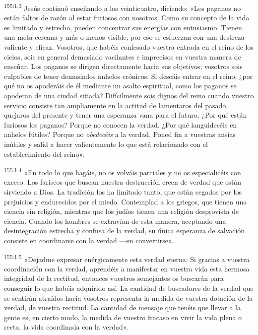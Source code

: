 \par 
\textsuperscript{155:1.3} Jesús continuó enseñando a los veinticuatro, diciendo: «Los paganos no están faltos de razón al estar furiosos con nosotros. Como su concepto de la vida es limitado y estrecho, pueden concentrar sus energías con entusiasmo. Tienen una meta cercana y más o menos visible; por eso se esfuerzan con una destreza valiente y eficaz. Vosotros, que habéis confesado vuestra entrada en el reino de los cielos, sois en general demasiado vacilantes e imprecisos en vuestra manera de enseñar. Los paganos se dirigen directamente hacia sus objetivos; vosotros sois culpables de tener demasiados anhelos crónicos. Si deseáis entrar en el reino, ¿por qué no os apoderáis de él mediante un asalto espiritual, como los paganos se apoderan de una ciudad sitiada? Difícilmente sois dignos del reino cuando vuestro servicio consiste tan ampliamente en la actitud de lamentaros del pasado, quejaros del presente y tener una esperanza vana para el futuro. ¿Por qué están furiosos los paganos? Porque no conocen la verdad. ¿Por qué languidecéis en anhelos fútiles? Porque no \textit{obedecéis} a la verdad. Poned fin a vuestras ansias inútiles y salid a hacer valientemente lo que está relacionado con el establecimiento del reino».

\par 
\textsuperscript{155:1.4} «En todo lo que hagáis, no os volváis parciales y no os especialicéis con exceso. Los fariseos que buscan nuestra destrucción creen de verdad que están sirviendo a Dios. La tradición los ha limitado tanto, que están cegados por los prejuicios y endurecidos por el miedo. Contemplad a los griegos, que tienen una ciencia sin religión, mientras que los judíos tienen una religión desprovista de ciencia. Cuando los hombres se extravían de esta manera, aceptando una desintegración estrecha y confusa de la verdad, su única esperanza de salvación consiste en coordinarse con la verdad ---en convertirse».

\par 
\textsuperscript{155:1.5} «Dejadme expresar enérgicamente esta verdad eterna: Si gracias a vuestra coordinación con la verdad, aprendéis a manifestar en vuestra vida esta hermosa integridad de la rectitud, entonces vuestros semejantes os buscarán para conseguir lo que habéis adquirido así. La cantidad de buscadores de la verdad que se sentirán atraídos hacia vosotros representa la medida de vuestra dotación de la verdad, de vuestra rectitud. La cantidad de mensaje que tenéis que llevar a la gente es, en cierto modo, la medida de vuestro fracaso en vivir la vida plena o recta, la vida coordinada con la verdad».


